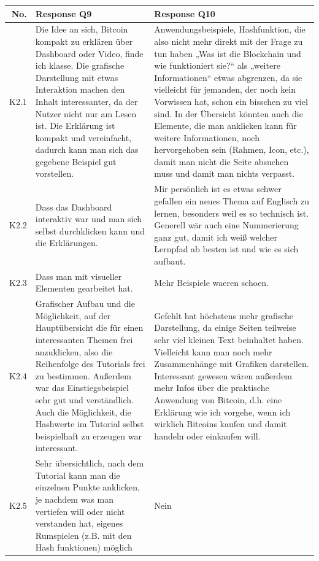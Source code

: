 \begin{table}[H]
    \centering
    \begin{tabularx}{\textwidth}{r|X|X}
         No. & Response Q9 & Response Q10 \\ \hline
         K2.1 & Die Idee an sich, Bitcoin kompakt zu erklären über Dashboard oder Video, finde ich klasse. Die grafische Darstellung mit etwas Interaktion machen den Inhalt interessanter, da der Nutzer nicht nur am Lesen ist. Die Erklärung ist kompakt und vereinfacht, dadurch kann man sich das gegebene Beispiel gut vorstellen. & Anwendungsbeispiele, Hashfunktion, die also nicht mehr direkt mit der Frage zu tun haben „Was ist die Blockchain und wie funktioniert sie?“ als „weitere Informationen“ etwas abgrenzen, da sie vielleicht für jemanden, der noch kein Vorwissen hat, schon ein bisschen zu viel sind. In der Übersicht könnten auch die Elemente, die man anklicken kann für weitere Informationen, noch hervorgehoben sein (Rahmen, Icon, etc.), damit man nicht die Seite absuchen muss und damit man nichts verpasst.\\
         K2.2 & Dass das Dashboard interaktiv war und man sich selbst durchklicken kann und die Erklärungen. & Mir persönlich ist es etwas schwer gefallen ein neues Thema auf Englisch zu lernen, besonders weil es so technisch ist. Generell wär auch eine Nummerierung ganz gut, damit ich weiß welcher Lernpfad ab besten ist und wie es sich aufbaut.\\
         K2.3 & Dass man mit visueller Elementen gearbeitet hat. & Mehr Beispiele waeren schoen. \\
         K2.4 & Grafischer Aufbau und die Möglichkeit, auf der Hauptübersicht die für einen interessanten Themen frei anzuklicken, also die Reihenfolge des Tutorials frei zu bestimmen. Außerdem war das Einstiegsbeispiel sehr gut und verständlich. Auch die Möglichkeit, die Hashwerte im Tutorial selbst beispielhaft zu erzeugen war interessant. & Gefehlt hat höchstens mehr grafische Darstellung, da einige Seiten teilweise sehr viel kleinen Text beinhaltet haben. Vielleicht kann man noch mehr Zusammenhänge mit Grafiken darstellen. Interessant gewesen wären außerdem mehr Infos über die praktische Anwendung von Bitcoin, d.h. eine Erklärung wie ich vorgehe, wenn ich wirklich Bitcoins kaufen und damit handeln oder einkaufen will.\\
         K2.5 & Sehr übersichtlich, nach dem Tutorial kann man die einzelnen Punkte anklicken, je nachdem was man vertiefen will oder nicht verstanden hat, eigenes Rumspielen (z.B. mit den Hash funktionen) möglich & Nein\\

\end{tabularx}
\end{table}
